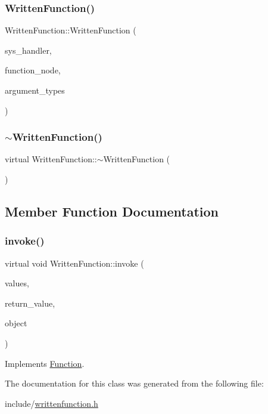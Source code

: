 \subsubsection{\texorpdfstring{Written\+Function()}{WrittenFunction()}}
{\footnotesize\ttfamily Written\+Function\+::\+Written\+Function (\begin{DoxyParamCaption}\item[{\hyperlink{classSystemHandler}{System\+Handler} $\ast$}]{sys\+\_\+handler,  }\item[{\hyperlink{classFunctionNode}{Function\+Node} $\ast$}]{function\+\_\+node,  }\item[{std\+::vector$<$ \hyperlink{classVarType}{Var\+Type} $>$}]{argument\+\_\+types }\end{DoxyParamCaption})}

\mbox{\label{classWrittenFunction_a46facc10f998146c7709772b0b662ad6}} 
\subsubsection{\texorpdfstring{$\sim$\+Written\+Function()}{~WrittenFunction()}}
{\footnotesize\ttfamily virtual Written\+Function\+::$\sim$\+Written\+Function (\begin{DoxyParamCaption}{ }\end{DoxyParamCaption})\hspace{0.3cm}{\ttfamily [virtual]}}



\subsection{Member Function Documentation}
\mbox{\label{classWrittenFunction_afe56e5eb6a13f6e38ab5ec87e371d745}} 
\subsubsection{\texorpdfstring{invoke()}{invoke()}}
{\footnotesize\ttfamily virtual void Written\+Function\+::invoke (\begin{DoxyParamCaption}\item[{std\+::vector$<$ \hyperlink{classValue}{Value} $>$}]{values,  }\item[{\hyperlink{classValue}{Value} $\ast$}]{return\+\_\+value,  }\item[{std\+::shared\+\_\+ptr$<$ \hyperlink{classObject}{Object} $>$}]{object }\end{DoxyParamCaption})\hspace{0.3cm}{\ttfamily [virtual]}}



Implements \hyperlink{classFunction_a84f9a63e68becc27e58ea738ba4cd698}{Function}.



The documentation for this class was generated from the following file\+:\begin{DoxyCompactItemize}
\item 
include/\hyperlink{writtenfunction_8h}{writtenfunction.\+h}\end{DoxyCompactItemize}
